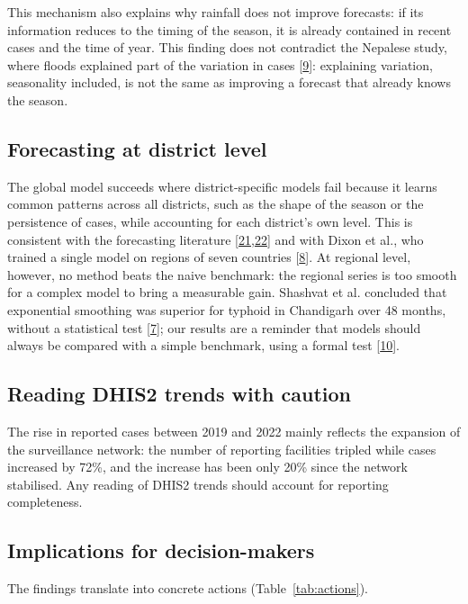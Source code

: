 \documentclass[11pt]{article}
\begin{document}
This mechanism also explains why rainfall does not improve forecasts: if its information reduces to the timing of the season, it is already contained in recent cases and the time of year. This finding does not contradict the Nepalese study, where floods explained part of the variation in cases [\hyperlink{ref9}{9}]: explaining variation, seasonality included, is not the same as improving a forecast that already knows the season.

\subsection{Forecasting at district level}
The global model succeeds where district-specific models fail because it learns common patterns across all districts, such as the shape of the season or the persistence of cases, while accounting for each district's own level. This is consistent with the forecasting literature [\hyperlink{ref21}{21},\hyperlink{ref22}{22}] and with Dixon et al., who trained a single model on regions of seven countries [\hyperlink{ref8}{8}]. At regional level, however, no method beats the naive benchmark: the regional series is too smooth for a complex model to bring a measurable gain. Shashvat et al. concluded that exponential smoothing was superior for typhoid in Chandigarh over 48 months, without a statistical test [\hyperlink{ref7}{7}]; our results are a reminder that models should always be compared with a simple benchmark, using a formal test [\hyperlink{ref10}{10}].

\subsection{Reading DHIS2 trends with caution}
The rise in reported cases between 2019 and 2022 mainly reflects the expansion of the surveillance network: the number of reporting facilities tripled while cases increased by 72\%, and the increase has been only 20\% since the network stabilised. Any reading of DHIS2 trends should account for reporting completeness.

\subsection{Implications for decision-makers}
The findings translate into concrete actions (Table~\ref{tab:actions}).
\end{document}
